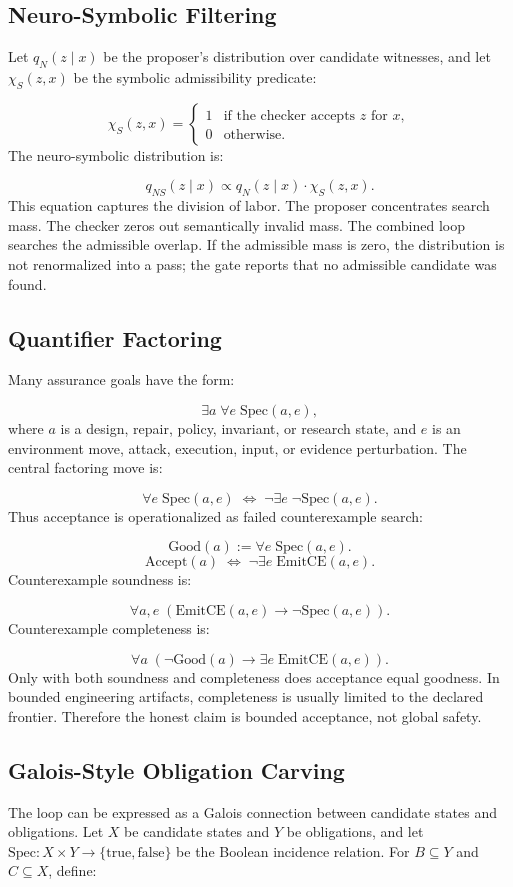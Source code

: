 \documentclass[11pt]{article}
\begin{document}
\subsection{Neuro-Symbolic Filtering}
Let $q_N(z\mid x)$ be the proposer's distribution over candidate witnesses, and let $\chi_S(z,x)$ be the symbolic admissibility predicate:

\[
\chi_S(z,x)=
\begin{cases}
1 & \text{if the checker accepts } z \text{ for } x,\\
0 & \text{otherwise.}
\end{cases}
\]
The neuro-symbolic distribution is:

\[
q_{NS}(z\mid x)\propto q_N(z\mid x)\cdot \chi_S(z,x).
\]
This equation captures the division of labor. The proposer concentrates search mass. The checker zeros out semantically invalid mass. The combined loop searches the admissible overlap. If the admissible mass is zero, the distribution is not renormalized into a pass; the gate reports that no admissible candidate was found.

\subsection{Quantifier Factoring}
Many assurance goals have the form:

\[
\exists a\;\forall e\;\mathrm{Spec}(a,e),
\]
where $a$ is a design, repair, policy, invariant, or research state, and $e$ is an environment move, attack, execution, input, or evidence perturbation. The central factoring move is:

\[
\forall e\;\mathrm{Spec}(a,e)
\;\Longleftrightarrow\;
\neg\exists e\;\neg\mathrm{Spec}(a,e).
\]
Thus acceptance is operationalized as failed counterexample search:

\[
\mathrm{Good}(a) := \forall e\;\mathrm{Spec}(a,e).
\]
\[
\mathrm{Accept}(a)
\;\Longleftrightarrow\;
\neg\exists e\;\mathrm{EmitCE}(a,e).
\]
Counterexample soundness is:

\[
\forall a,e\;(\mathrm{EmitCE}(a,e)\rightarrow\neg\mathrm{Spec}(a,e)).
\]
Counterexample completeness is:

\[
\forall a\;(\neg\mathrm{Good}(a)\rightarrow\exists e\;\mathrm{EmitCE}(a,e)).
\]
Only with both soundness and completeness does acceptance equal goodness. In bounded engineering artifacts, completeness is usually limited to the declared frontier. Therefore the honest claim is bounded acceptance, not global safety.

\subsection{Galois-Style Obligation Carving}
The loop can be expressed as a Galois connection between candidate states and obligations. Let $X$ be candidate states and $Y$ be obligations, and let $\mathrm{Spec}:X\times Y\to\{\mathrm{true},\mathrm{false}\}$ be the Boolean incidence relation. For $B\subseteq Y$ and $C\subseteq X$, define:
\end{document}
